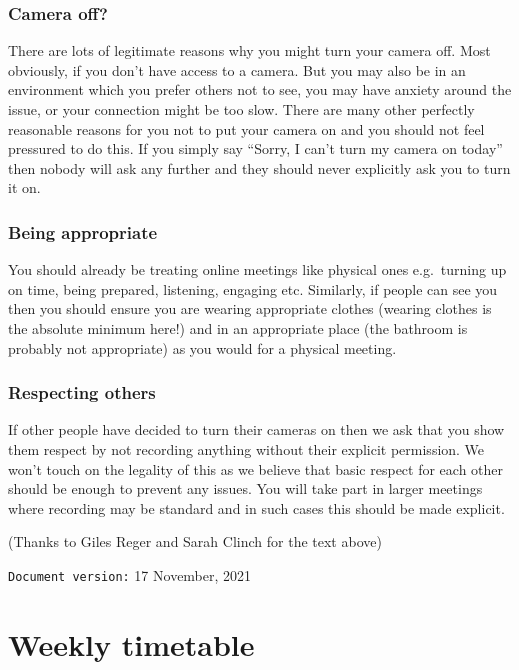 \documentclass[
]{book}
\begin{document}
\hypertarget{off}{%
\subsection{Camera off?}\label{off}}

There are lots of legitimate reasons why you might turn your camera off. Most obviously, if you don't have access to a camera. But you may also be in an environment which you prefer others not to see, you may have anxiety around the issue, or your connection might be too slow. There are many other perfectly reasonable reasons for you not to put your camera on and you should not feel pressured to do this. If you simply say ``Sorry, I can't turn my camera on today'' then nobody will ask any further and they should never explicitly ask you to turn it on.

\hypertarget{being}{%
\subsection{Being appropriate}\label{being}}

You should already be treating online meetings like physical ones e.g.~turning up on time, being prepared, listening, engaging etc. Similarly, if people can see you then you should ensure you are wearing appropriate clothes (wearing clothes is the absolute minimum here!) and in an appropriate place (the bathroom is probably not appropriate) as you would for a physical meeting.

\hypertarget{respecting}{%
\subsection{Respecting others}\label{respecting}}

If other people have decided to turn their cameras on then we ask that you show them respect by not recording anything without their explicit permission. We won't touch on the legality of this as we believe that basic respect for each other should be enough to prevent any issues. You will take part in larger meetings where recording may be standard and in such cases this should be made explicit.

(Thanks to Giles Reger and Sarah Clinch for the text above)

\texttt{Document\ version:} 17 November, 2021

\hypertarget{timetabling}{%
\chapter*{Weekly timetable}\label{timetabling}}
\end{document}
